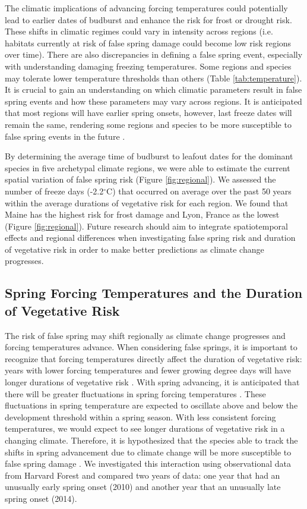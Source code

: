 \documentclass{article}\usepackage[]{graphicx}\usepackage[]{color}
\begin{document}
The climatic implications of advancing forcing temperatures could potentially lead to earlier dates of budburst and enhance the risk for frost or drought risk. These shifts in climatic regimes could vary in intensity across regions (i.e. habitats currently at risk of false spring damage could become low risk regions over time). There are also discrepancies in defining a false spring event, especially with understanding damaging freezing temperatures. Some regions and species may tolerate lower temperature thresholds than others (Table \ref{tab:temperature}). It is crucial to gain an understanding on which climatic parameters result in false spring events and how these parameters may vary across regions. It is anticipated that most regions will have earlier spring onsets, however, last freeze dates will remain the same, rendering some regions and species to be more susceptible to false spring events in the future \citep{Labe2016}. 

By determining the average time of budburst to leafout dates for the dominant species in five archetypal climate regions, we were able to estimate the current spatial variation of false spring risk (Figure \ref{fig:regional}). We assessed the number of freeze days (-2.2$^{\circ}$C) \citep{Schwartz1993} that occurred on average over the past 50 years within the average durations of vegetative risk for each region. We found that Maine has the highest risk for frost damage and Lyon, France as the lowest (Figure \ref{fig:regional}). Future research should aim to integrate spatiotemporal effects and regional differences when investigating false spring risk and duration of vegetative risk in order to make better predictions as climate change progresses.

\subsection{Spring Forcing Temperatures and the Duration of Vegetative Risk}
The risk of false spring may shift regionally as climate change progresses and forcing temperatures advance. When considering false springs, it is important to recognize that forcing temperatures directly affect the duration of vegetative risk: years with lower forcing temperatures and fewer growing degree days will have longer durations of vegetative risk \citep{Donnelly2017}. With spring advancing, it is anticipated that there will be greater fluctuations in spring forcing temperatures \citep{Martin2010}. These fluctuations in spring temperature are expected to oscillate above and below the development threshold within a spring season. With less consistent forcing temperatures, we would expect to see longer durations of vegetative risk in a changing climate. Therefore, it is hypothesized that the species able to track the shifts in spring advancement due to climate change will be more susceptible to false spring damage \citep{Scheifinger2003}. We investigated this interaction using observational data from Harvard Forest \citep{Okeefe2014} and compared two years of data: one year that had an unusually early spring onset (2010) and another year that an unusually late spring onset (2014).
\end{document}
